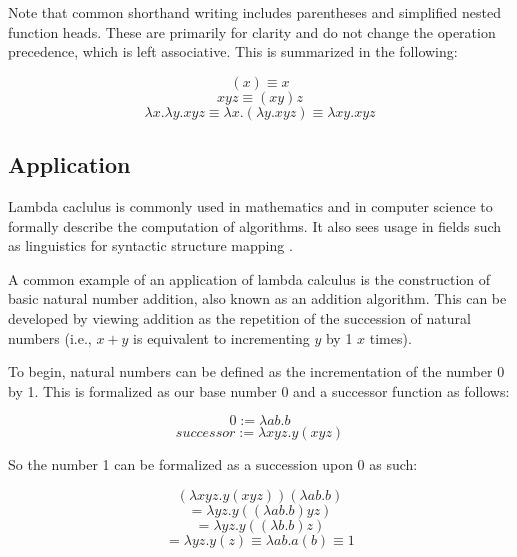 \documentclass[letterpaper, 10 pt, conference]{ieeeconf}  %
\begin{document}
Note that common shorthand writing includes parentheses and simplified nested function heads. These are primarily for clarity and do not change the operation precedence, which is left associative. This is summarized in the following:

\begin{equation}
    (x) \equiv x
\end{equation}
\begin{equation}
    xyz \equiv (xy)z
\end{equation}
\begin{equation}
    \lambda x . \lambda y . xyz \equiv \lambda x . (\lambda y.xyz) \equiv \lambda xy.xyz
\end{equation}

\subsection{Application}

Lambda caclulus is commonly used in mathematics and in computer science to formally describe the computation of algorithms. It also sees usage in fields such as linguistics for syntactic structure mapping \cite{Deustch2}.

A common example of an application of lambda calculus is the construction of basic natural number addition, also known as an addition algorithm. This can be developed by viewing addition as the repetition of the succession of natural numbers (i.e., $x + y$ is equivalent to incrementing $y$ by 1 $x$ times).

To begin, natural numbers can be defined as the incrementation of the number 0 by 1. This is formalized \cite{Rojas} as our base number 0 and a successor function as follows:

\begin{equation}
    0 := \lambda ab . b
\end{equation}
\begin{equation}
    successor := \lambda xyz . y(xyz)
\end{equation}

So the number 1 can be formalized as a succession upon 0 as such:

\begin{equation}
    (\lambda xyz . y(xyz))(\lambda ab . b)
\end{equation}
\begin{equation}
    = \lambda yz . y((\lambda ab . b)yz)
\end{equation}
\begin{equation}
    = \lambda yz . y((\lambda b . b)z)
\end{equation}
\begin{equation}
    = \lambda yz . y(z) \equiv \lambda ab . a(b) \equiv 1
\end{equation}
\end{document}

